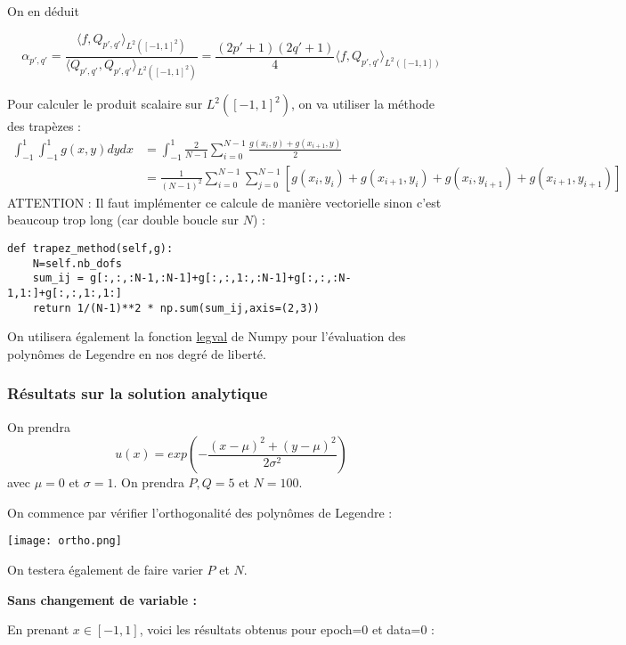 \begin{enumerate}[label=\textbullet]
	On en déduit
	
	$$\alpha_{p',q'} = \frac{\langle f,Q_{p',q'}\rangle_{L^2([-1,1]^2)}}{\langle Q_{p',q'},Q_{p',q'}\rangle_{L^2([-1,1]^2)}}=\frac{(2p'+1)(2q'+1)}{4}\langle f,Q_{p',q'}\rangle_{L^2([-1,1])}$$
	
	\begin{Rem}
		Pour calculer le produit scalaire sur $L^2([-1,1]^2)$, on va utiliser la méthode des trapèzes :
		\begin{align*}
			\int_{-1}^1\int_{-1}^1 g(x,y)dydx&=\int_{-1}^1\frac{2}{N-1}\sum_{i=0}^{N-1}\frac{g(x_i,y)+g(x_{i+1},y)}{2} \\
			&= \frac{1}{(N-1)^2}\sum_{i=0}^{N-1}\sum_{j=0}^{N-1}\left[g(x_i,y_i)+g(x_{i+1},y_i)+g(x_i,y_{i+1})+g(x_{i+1},y_{i+1})\right]
		\end{align*}
		ATTENTION : Il faut implémenter ce calcule de manière vectorielle sinon c'est beaucoup trop long (car double boucle sur $N$) :
\begin{lstlisting}
def trapez_method(self,g):
	N=self.nb_dofs
	sum_ij = g[:,:,:N-1,:N-1]+g[:,:,1:,:N-1]+g[:,:,:N-1,1:]+g[:,:,1:,1:]
	return 1/(N-1)**2 * np.sum(sum_ij,axis=(2,3))
\end{lstlisting}
		On utilisera également la fonction \href{https://numpy.org/doc/stable/reference/generated/numpy.polynomial.legendre.legval.html}{legval} de Numpy pour l'évaluation des polynômes de Legendre en nos degré de liberté.
	\end{Rem}
\end{enumerate}

\subsubsection{Résultats sur la solution analytique}

On prendra
$$u(x)=exp\left(-\frac{(x-\mu)^2+(y-\mu)^2}{2\sigma^2}\right)$$
avec $\mu=0$ et $\sigma=1$.
On prendra $P,Q=5$ et $N=100$.

On commence par vérifier l'orthogonalité des polynômes de Legendre :

\begin{minipage}{\linewidth}
	\centering
	\texttt{[image: ortho.png]}
\end{minipage}

On testera également de faire varier $P$ et $N$.

\textbf{Sans changement de variable :}

En prenant $x\in[-1,1]$, voici les résultats obtenus pour epoch=0 et data=0 :

